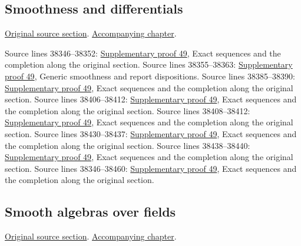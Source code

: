 \subsection{Smoothness and differentials}
\hypertarget{algebra-source-section-smooth-differential}{}
\noindent\href{https://github.com/stacks/stacks-project/blob/a04446e57ec1fbc252a871afcec7752fb2807b14/algebra.tex\#L38340}{Original source section}. \href{algebra.pdf\#nameddest=section-smooth-differential}{Accompanying chapter}.

\begin{AlgebraSourceRoutes}
 Source lines 38346--38352: \hyperlink{algebra_smooth_fields_notes_20260928}{Supplementary proof 49}, Exact sequences and the completion along the original section.
 Source lines 38355--38363: \hyperlink{algebra_smooth_fields_notes_20260928}{Supplementary proof 49}, Generic smoothness and report dispositions.
 Source lines 38385--38390: \hyperlink{algebra_smooth_fields_notes_20260928}{Supplementary proof 49}, Exact sequences and the completion along the original section.
 Source lines 38406--38412: \hyperlink{algebra_smooth_fields_notes_20260928}{Supplementary proof 49}, Exact sequences and the completion along the original section.
 Source lines 38408--38412: \hyperlink{algebra_smooth_fields_notes_20260928}{Supplementary proof 49}, Exact sequences and the completion along the original section.
 Source lines 38430--38437: \hyperlink{algebra_smooth_fields_notes_20260928}{Supplementary proof 49}, Exact sequences and the completion along the original section.
 Source lines 38438--38440: \hyperlink{algebra_smooth_fields_notes_20260928}{Supplementary proof 49}, Exact sequences and the completion along the original section.
 Source lines 38346--38460: \hyperlink{algebra_smooth_fields_notes_20260928}{Supplementary proof 49}, Exact sequences and the completion along the original section.
\end{AlgebraSourceRoutes}

\subsection{Smooth algebras over fields}
\hypertarget{algebra-source-section-smooth-over-field}{}
\noindent\href{https://github.com/stacks/stacks-project/blob/a04446e57ec1fbc252a871afcec7752fb2807b14/algebra.tex\#L38467}{Original source section}. \href{algebra.pdf\#nameddest=section-smooth-over-field}{Accompanying chapter}.

